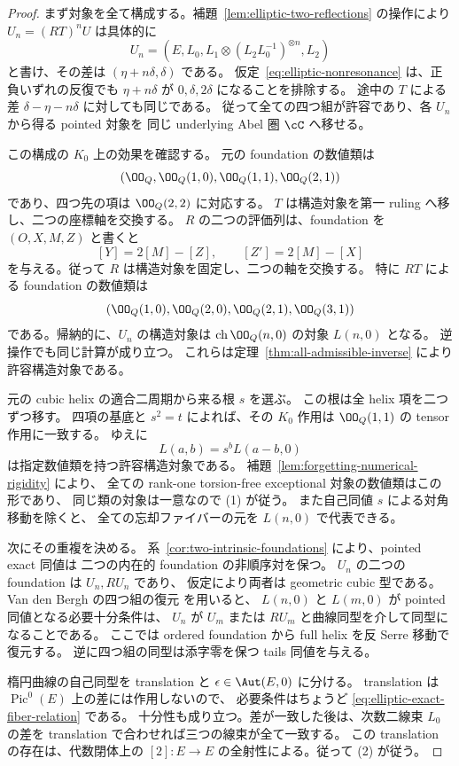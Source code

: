 \begin{proof}
まず対象を全て構成する。補題~\ref{lem:elliptic-two-reflections} の操作により
$U_n=(RT)^nU$ は具体的に
\[
 U_n=(E,L_0,L_1\otimes(L_2L_0^{-1})^{\otimes n},L_2)
\]
と書け、その差は $(\eta+n\delta,\delta)$ である。
仮定~\eqref{eq:elliptic-nonresonance} は、正負いずれの反復でも
$\eta+n\delta$ が $0,\delta,2\delta$ になることを排除する。
途中の $T$ による差 $\delta-\eta-n\delta$ に対しても同じである。
従って全ての四つ組が許容であり、各 $U_n$ から得る pointed 対象を
同じ underlying Abel 圏 $\cC$ へ移せる。

この構成の $K_0$ 上の効果を確認する。
元の foundation の数値類は
\[
 (\OO_Q,\OO_Q(1,0),\OO_Q(1,1),\OO_Q(2,1))
\]
であり、四つ先の項は $\OO_Q(2,2)$ に対応する。
$T$ は構造対象を第一 ruling へ移し、二つの座標軸を交換する。
$R$ の二つの評価列は、foundation を $(O,X,M,Z)$ と書くと
\[
 [Y]=2[M]-[Z],\qquad [Z']=2[M]-[X]
\]
を与える。従って $R$ は構造対象を固定し、二つの軸を交換する。
特に $RT$ による foundation の数値類は
\[
 (\OO_Q(1,0),\OO_Q(2,0),\OO_Q(2,1),\OO_Q(3,1))
\]
である。帰納的に、$U_n$ の構造対象は
$\operatorname{ch}\OO_Q(n,0)$ の対象 $L(n,0)$ となる。
逆操作でも同じ計算が成り立つ。
これらは定理~\ref{thm:all-admissible-inverse} により許容構造対象である。

元の cubic helix の適合二周期から来る根 $s$ を選ぶ。
この根は全 helix 項を二つずつ移す。
四項の基底と $s^2=t$ によれば、その $K_0$ 作用は
$\OO_Q(1,1)$ の tensor 作用に一致する。
ゆえに
\[
 L(a,b)=s^b L(a-b,0)
\]
は指定数値類を持つ許容構造対象である。
補題~\ref{lem:forgetting-numerical-rigidity} により、
全ての rank-one torsion-free exceptional 対象の数値類はこの形であり、
同じ類の対象は一意なので (1) が従う。
また自己同値 $s$ による対角移動を除くと、
全ての忘却ファイバーの元を $L(n,0)$ で代表できる。

次にその重複を決める。
系~\ref{cor:two-intrinsic-foundations} により、pointed exact 同値は
二つの内在的 foundation の非順序対を保つ。
$U_n$ の二つの foundation は $U_n,RU_n$ であり、
仮定により両者は geometric cubic 型である。
Van den Bergh の四つ組の復元
\cite[arXiv v3, Theorem 5.5.10]{VdB2011} を用いると、
$L(n,0)$ と $L(m,0)$ が pointed 同値となる必要十分条件は、
$U_n$ が $U_m$ または $RU_m$ と曲線同型を介して同型になることである。
ここでは ordered foundation から full helix を反 Serre 移動で復元する。
逆に四つ組の同型は添字零を保つ tails 同値を与える。

楕円曲線の自己同型を translation と $\epsilon\in\Aut(E,0)$ に分ける。
translation は $\operatorname{Pic}^0(E)$ 上の差には作用しないので、
必要条件はちょうど \eqref{eq:elliptic-exact-fiber-relation} である。
十分性も成り立つ。差が一致した後は、次数二線束 $L_0$ の差を
translation で合わせれば三つの線束が全て一致する。
この translation の存在は、代数閉体上の
$[2]:E\to E$ の全射性による。従って (2) が従う。


\end{proof}
